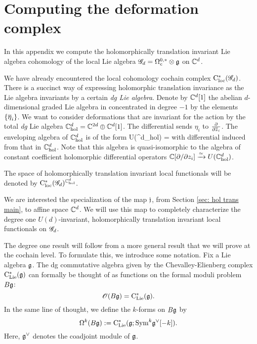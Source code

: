 \appendix

\section{Computing the deformation complex}\label{sec: hol trans}

In this appendix we compute the holomorphically translation invariant Lie algebra cohomology of the local Lie algebra $\sG_d = \Omega^{0,*}_c \tensor \fg$ on $\CC^d$. 

We have already encountered the local cohomology cochain complex $\cloc^*(\sG_d)$.
There is a succinct way of expressing holomorphic translation invariance as the Lie algebra invariants by a certain {\em dg Lie algebra}.
Denote by $\CC^d[1]$ the abelian $d$-dimensional graded Lie algebra in concentrated in degree $-1$ by the elements $\{\Bar{\eta}_i\}$.
We want to consider deformations that are invariant for the action by the total {\em dg} Lie algebra $\CC^{d}_{\rm hol} = \CC^{2d} \oplus \CC^d[1]$.
The differential sends $\eta_i$ to $\frac{\partial}{\partial \zbar_i}$.
The enveloping algebra of $\CC^d_{\rm hol}$ is of the form
\beqn
U(\CC^{d}_{\rm hol}) = \CC {}
\eeqn
with differential induced from that in $\CC^{d}_{\rm hol}$. 
Note that this algebra is quasi-isomorphic to the algebra of constant coefficient holomorphic differential operators $\CC[\partial / \partial z_i] \xto{\simeq} U(\CC^{d}_{\rm hol})$. 

The space of holomorphically translation invariant local functionals will be denoted by $\cloc^*(\sG_d)^{\CC^d_{\rm hol}}$.

We are interested the specialization of the map $\fj$, from Section \ref{sec: hol trans main}, to affine space $\CC^d$.
We will use this map to completely characterize the degree one $U(d)$-invariant, holomorphically translation invariant local functionals on $\sG_d$. 

The degree one result will follow from a more general result that we will prove at the cochain level.
To formulate this, we introduce some notation.
Fix a Lie algebra $\fg$. 
The dg commutative algebra given by the Chevalley-Elienberg complex $\clie^*(\fg)$ can formally be thought of as functions on the formal moduli problem $B \fg$:
\[
\sO(B \fg) = \clie^*(\fg) .
\]
In the same line of thought, we define the $k$-forms on $B\fg$ by
\[
\Omega^k(B \fg) := \clie^*(\fg ; \Sym^k \fg^\vee [-k]) .
\]
Here, $\fg^\vee$ denotes the coadjoint module of $\fg$. 


